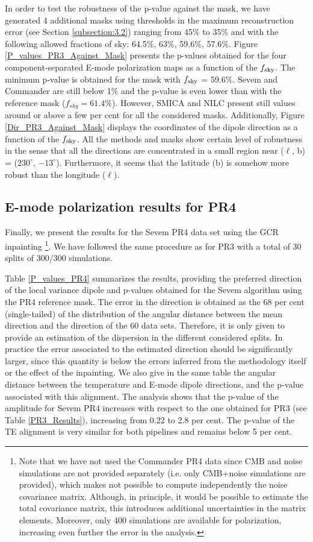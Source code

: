 {In order to test the robustness of the p-value against the mask, we have generated 4 additional masks using thresholds in the maximum reconstruction error (see Section \ref{subsection:3.2}) ranging from 45\% to 35\% and with the following allowed fractions of sky: 64.5\%, 63\%, 59.6\%, 57.6\%. Figure \ref{P_values_PR3_Against_Mask} presents the p-values obtained for the four component-separated E-mode polarization maps as a function of the $f_{\rm sky}$. The minimum p-value is obtained for the mask with $f_{\rm sky}$ = 59.6\%. Sevem and Commander are still below 1\% and the p-value is even lower than with the reference mask ($f_{sky} = 61.4\%$). However, SMICA and NILC present still values around or above a few per cent for all the considered masks. Additionally, Figure \ref{Dir_PR3_Against_Mask} displays the coordinates of the dipole direction as a function of the $f_{\rm sky}$. All the methods and masks show certain level of robustness in the sense that all the directions are concentrated in a small region near ($\ell$, b) = ($230^{\circ}$, $-13^{\circ}$). Furthermore, it seems that the latitude (b) is somehow more robust than the longitude ($\ell$).

\subsection{E-mode polarization results for PR4}\label{PR4_E_Results}

Finally, we present the results for the Sevem PR4 data set using the GCR inpainting \footnote{Note that we have not used the Commander PR4 data since CMB and noise simulations are not provided separately
(i.e. only CMB+noise simulations are provided), which makes not possible to compute independently the noise covariance matrix. 
Although, in principle, it would be possible to estimate the total covariance matrix, this introduces additional uncertainties in the matrix elements. Moreover, only 400 simulations are available for polarization, increasing even further the error in the analysis.}.
We have followed the same procedure as for PR3 with a total of 
30 splits of 300/300 simulations.

Table \ref{P_values_PR4} summarizes the results, providing the preferred direction of the local variance dipole and p-values obtained for the Sevem algorithm using the PR4 reference mask. The error in the direction is obtained as the 68 per cent (single-tailed) of the distribution of the angular distance between the mean direction and the direction of the 60 data sets. Therefore, it is only given to provide an estimation of the dispersion in the different considered splits. In practice the error associated to the estimated direction should be significantly larger, since this quantity is below the errors inferred from the methodology itself or the effect of the inpainting. 
We also give in the same table the angular distance between the temperature and E-mode dipole directions, and the p-value associated with this alignment. The analysis shows that the p-value of the amplitude for Sevem PR4 increases with respect to the one obtained for PR3 (see Table \ref{PR3_Results}), increasing from 0.22 to 2.8 per cent. The p-value of the TE alignment is very similar for both pipelines and remains below 5 per cent.

}
